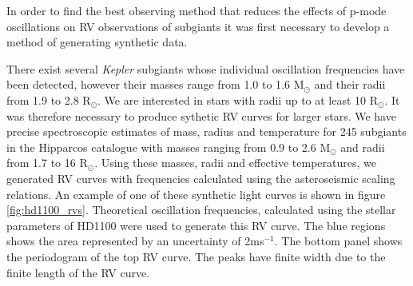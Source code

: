 \documentclass[useAMS, usenatbib]{aastex}
\newcommand{\nsubs}{7}
\begin{document}
In order to find the best observing method that reduces the effects of p-mode
oscillations on RV observations of subgiants it was first necessary to develop
a method of generating synthetic data.

There exist several {\it Kepler} subgiants whose individual oscillation
frequencies have been detected, however their masses range from 1.0 to 1.6
M$_\odot$ and their radii from 1.9 to 2.8 R$_\odot$.
We are interested in stars with radii up to at least 10 R$_\odot$.
It was therefore necessary to produce sythetic RV curves for larger stars.
We have precise spectroscopic estimates of mass, radius and temperature for
245 subgiants in the Hipparcos catalogue with masses ranging from 0.9 to 2.6
M$_\odot$ and radii from 1.7 to 16 R$_\odot$.
Using these masses, radii and effective temperatures, we generated RV curves
with frequencies calculated using the asteroseismic scaling relations.
An example of one of these synthetic light curves is shown in figure
\ref{fig:hd1100_rvs}.
Theoretical oscillation frequencies, calculated using the stellar parameters
of HD1100 were used to generate this RV curve.
The blue regions shows the area represented by an uncertainty of 2ms$^{-1}$.
The bottom panel shows the periodogram of the top RV curve.
The peaks have finite width due to the finite length of the RV curve.
\end{document}
